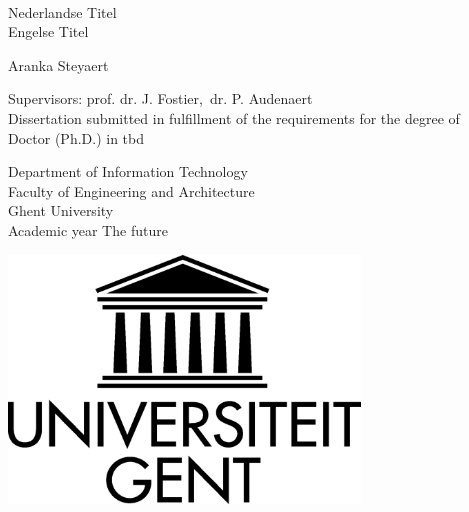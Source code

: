 
{\large \ \vspace{0.25\textheight} \\

\hspace{-\parindent}Nederlandse Titel\\

\hspace{-\parindent}Engelse Titel


\vspace{0.5cm}
\hspace{-\parindent}Aranka Steyaert

}

\vspace*{\fill}
\hspace{-\parindent}Supervisors: prof. dr. J. Fostier,~dr. P. Audenaert\\
\hspace{-\parindent}Dissertation submitted in fulfillment of the requirements for the degree of\\
\hspace{-\parindent}Doctor (Ph.D.) in tbd\\


\vspace{0.5cm}

\hspace{-\parindent}\begin{minipage}{0.7\textwidth}
  \hspace{-\parindent}Department of Information Technology\\
  \hspace{-\parindent}Faculty of Engineering and Architecture\\
  \hspace{-\parindent}Ghent University\\
  \hspace{-\parindent}Academic year The future
\end{minipage}
\begin{minipage}{0.3\textwidth}
  \begin{flushright}
    \includegraphics[width=0.7\textwidth]{./figures/logo-ugent}
  \end{flushright}
\end{minipage}

